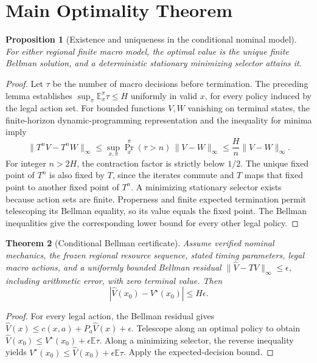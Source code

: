 \documentclass[11pt]{article}
\newtheorem{theorem}{Theorem}
\newtheorem{proposition}[theorem]{Proposition}
\theoremstyle{definition}\newtheorem{definition}[theorem]{Definition}
\newcommand{\E}{\mathbb E}\newcommand{\R}{\mathcal R}
\begin{document}
\section{Main Optimality Theorem}
\begin{proposition}[Existence and uniqueness in the conditional nominal model]
For either regional finite macro model, the optimal value is the unique finite Bellman solution, and a deterministic stationary minimizing selector attains it.
\end{proposition}
\begin{proof}
Let $\tau$ be the number of macro decisions before termination. The preceding lemma establishes $\sup_\pi\E_x^\pi\tau\le H$ uniformly in valid $x$, for every policy induced by the legal action set. For bounded functions $V,W$ vanishing on terminal states, the finite-horizon dynamic-programming representation and the inequality for minima imply
\[
 \|T^n V-T^n W\|_\infty
 \le \sup_{x,\pi}\Pr_x^\pi(\tau>n)\,\|V-W\|_\infty
 \le \frac{H}{n}\|V-W\|_\infty.
\]
For integer $n>2H$, the contraction factor is strictly below $1/2$. The unique fixed point of $T^n$ is also fixed by $T$, since the iterates commute and $T$ maps that fixed point to another fixed point of $T^n$. A minimizing stationary selector exists because action sets are finite. Properness and finite expected termination permit telescoping its Bellman equality, so its value equals the fixed point. The Bellman inequalities give the corresponding lower bound for every other legal policy.
\end{proof}

\begin{theorem}[Conditional Bellman certificate]
Assume verified nominal mechanics, the frozen regional resource sequence, stated timing parameters, legal macro actions, and a uniformly bounded Bellman residual $\|\widehat V-T\widehat V\|_\infty\le\epsilon$, including arithmetic error, with zero terminal value. Then
\[
 |\widehat V(x_0)-V^\star(x_0)|\le H\epsilon.
\]
\end{theorem}
\begin{proof}
For every legal action, the Bellman residual gives $\widehat V(x)\le c(x,a)+P_a\widehat V(x)+\epsilon$. Telescope along an optimal policy to obtain $\widehat V(x_0)\le V^\star(x_0)+\epsilon\E\tau$. Along a minimizing selector, the reverse inequality yields $V^\star(x_0)\le\widehat V(x_0)+\epsilon\E\tau$. Apply the expected-decision bound.
\end{proof}
\end{document}
